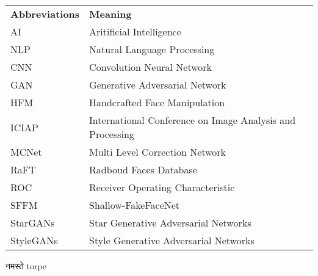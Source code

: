 \begin{table}[h]
	\begin{tabular}{l l}
		\textbf{Abbreviations} & \textbf{Meaning}                                   \\
		AI                     & Aritificial Intelligence\\
		NLP                    & Natural Language Processing\\
		CNN                    & Convolution Neural Network                         \\
		GAN                    & Generative Adversarial Network                     \\
		HFM                    & Handcrafted Face Manipulation                       \\
		ICIAP                  & International Conference on Image Analysis and Processing \\
		MCNet                  & Multi Level Correction Network                     \\
		RaFT                   & Radboud Faces Database                             \\
		ROC                    & Receiver Operating Characteristic                   \\
		SFFM                   & Shallow-FakeFaceNet                                 \\
		StarGANs               & Star Generative Adversarial Networks               \\
		StyleGANs              & Style Generative Adversarial Networks               \\
	\end{tabular}
\end{table}
\pagebreak

 \textsanskrit{नमस्ते}
 \textenglish{torpe}